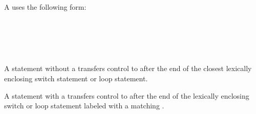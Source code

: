 
A  uses the following form:

\begin{Syntax}
	 \\
		  \\
		 \code{(} \SynOpt \code{)} \code{;}		
\end{Syntax}


\begin{Checking}
\end{Checking}



\begin{Syntax}
		 \SynOpt \code{;} \\
\end{Syntax}

\begin{Description}
A  statement without a  transfers control to after the end of the closest lexically enclosing switch statement or loop statement.

A  statement with a  transfers control to after the end of the lexically enclosing switch or loop statement labeled with a matching .
\end{Description}

\begin{Checking}
	 \\

\end{Checking}

